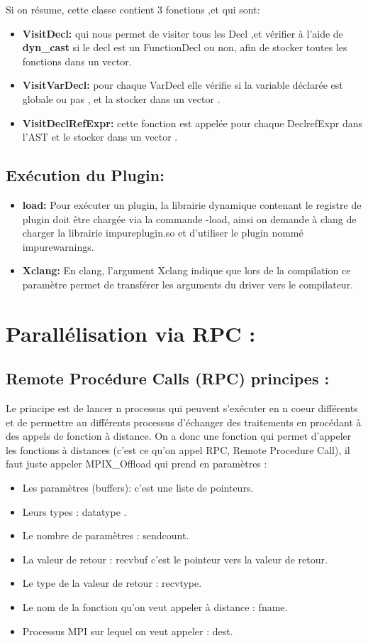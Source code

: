 \documentclass[12pt,titlepage]{article}
\begin{document}
Si on résume, cette  classe contient 3 fonctions ,et qui sont: 
\begin{itemize}
    \item  \textbf{VisitDecl:} qui nous permet de visiter tous les Decl ,et vérifier à l’aide de \textbf{ dyn\_cast} si le decl est un FunctionDecl ou non, afin de stocker toutes les fonctions dans  un vector.
\item \textbf{VisitVarDecl:} pour chaque VarDecl elle vérifie si la variable déclarée est globale ou pas , et la stocker dans un vector .
\item \textbf{VisitDeclRefExpr:} cette fonction est appelée pour chaque DeclrefExpr dans l’AST et le stocker dans un vector .
\end{itemize}

\subsection{ Exécution du Plugin:}

\begin{itemize}
    \item \textbf{load:}
Pour exécuter un plugin, la librairie dynamique contenant le registre de plugin doit être chargée via la commande -load, ainsi on demande à clang de charger la librairie impureplugin.so et d'utiliser le plugin nommé  impurewarnings.
\item \textbf{ Xclang:}
En clang, l'argument Xclang indique que lors de la compilation ce paramètre permet de transférer les arguments du driver vers le compilateur.
\end{itemize}


\section{Parallélisation via RPC : }

\subsection{Remote Procédure Calls (RPC) principes :}
Le principe est de lancer n processus qui peuvent s'exécuter en n coeur différents et de permettre au différents processus d'échanger des traitements en procédant à des appels de fonction à distance. On a donc une fonction qui permet d'appeler les fonctions à distances (c'est ce qu'on appel RPC, Remote Procedure Call), il faut juste appeler MPIX\_Offload qui prend en paramètres :

\begin{itemize}
\item Les paramètres (buffers): c'est une liste de pointeurs.
\item Leurs types : datatype .
\item Le nombre de paramètres : sendcount. 
\item La valeur de retour : recvbuf c'est le pointeur vers la valeur de retour.
\item Le type de la valeur de retour : recvtype.
\item Le nom de la fonction qu'on veut appeler à distance : fname.
\item Processus MPI sur lequel on veut appeler : dest.
\end{itemize}
\end{document}
